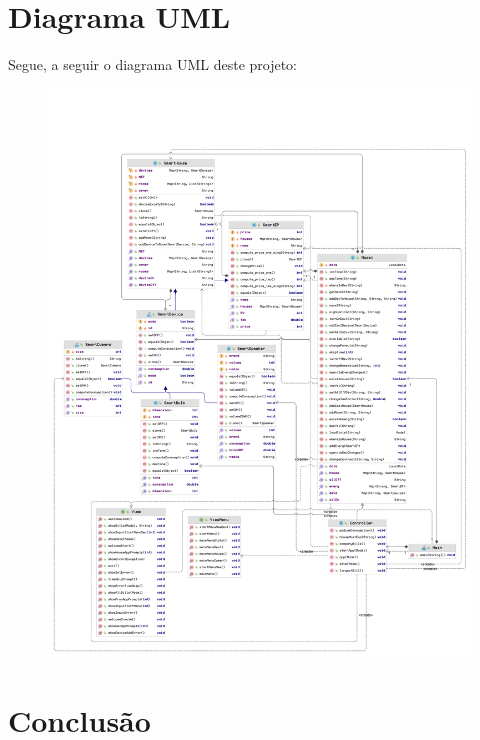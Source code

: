 \documentclass[10pt, a4paper]{article}
\begin{document}
\section{Diagrama UML}
Segue, a seguir o diagrama UML deste projeto:
\begin{figure}
        \centering
        \includegraphics[width=\textwidth]{diagram.png}
\end{figure}

\newpage
\section{Conclusão}
\lipsum[1-2]
\end{document}
